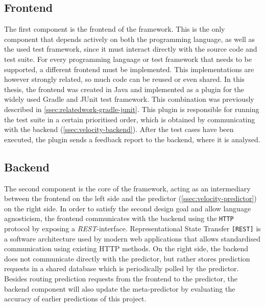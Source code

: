 \subsection{Frontend}\label{ssec:velocity-frontend}
The first component is the frontend of the framework. This is the only component that depends actively on both the programming language, as well as the used test framework, since it must interact directly with the source code and test suite. For every programming language or test framework that needs to be supported, a different frontend must be implemented. This implementations are however strongly related, so much code can be reused or even shared. In this thesis, the frontend was created in Java and implemented as a plugin for the widely used Gradle and JUnit test framework. This combination was previously described in \autoref{ssec:relatedwork-gradle-junit}. This plugin is responsible for running the test suite in a certain prioritised order, which is obtained by communicating with the backend (\autoref{ssec:velocity-backend}). After the test cases have been executed, the plugin sends a feedback report to the backend, where it is analysed.

\subsection{Backend}\label{ssec:velocity-backend}
The second component is the core of the framework, acting as an intermediary between the frontend on the left side and the predictor (\autoref{ssec:velocity-predictor}) on the right side. In order to satisfy the second design goal and allow language agnosticism, the frontend communicates with the backend using the \texttt{HTTP} protocol by exposing a \emph{REST}-interface. Representational State Transfer \texttt{[REST]} is a software architecture used by modern web applications that allows standardised communication using existing HTTP methods. On the right side, the backend does not communicate directly with the predictor, but rather stores prediction requests in a shared database which is periodically polled by the predictor. Besides routing prediction requests from the frontend to the predictor, the backend component will also update the meta-predictor by evaluating the accuracy of earlier predictions of this project.

